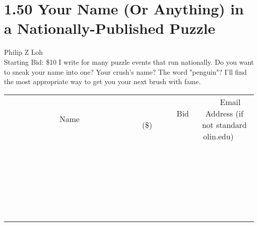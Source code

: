 \documentclass[11pt]{article}
\begin{document}
\section*{1.50 Your Name (Or Anything) in a Nationally-Published Puzzle}
Philip Z Loh
\\
Starting Bid: \$10
\newline
I write for many puzzle events that run nationally. Do you want to sneak your name into one? Your crush's name? The word "penguin"? I'll find the most appropriate way to get you your next brush with fame.
\\[6ex]
\begin{tabular}{c c c}
~~~~~~~~~~~~~Name~~~~~~~~~~~~~ & ~~~~~~~~~Bid (\$)~~~~~~~~~  & ~~~Email Address (if not standard olin.edu)~~~\\
 & & \\
\hline
 & & \\
\hline
 & & \\
\hline
 & & \\
\hline
 & & \\
\hline
 & & \\
\hline
 & & \\
\hline
 & & \\
\hline
 & & \\
\hline
 & & \\
\hline
 & & \\
\hline
 & & \\
\hline
 & & \\
\hline
 & & \\
\hline
 & & \\
\hline
 & & \\
\hline
 & & \\
\hline
 & & \\
\hline
 & & \\
\hline
 & & \\
\hline
 & & \\
\hline
 & & \\
\hline
 & & \\
\hline
 & & \\
\hline
 & & \\
\hline
 & & \\
\hline
\end{tabular}
\newpage
\end{document}
